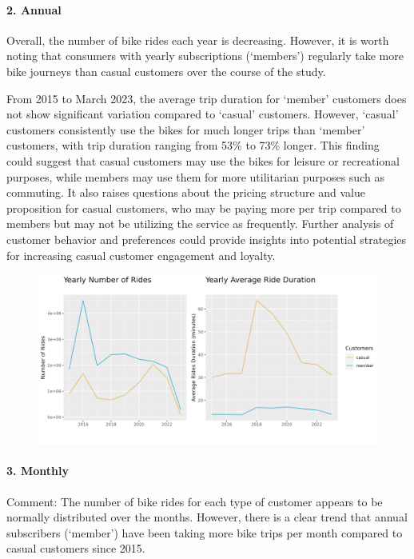 \documentclass[
]{article}
\begin{document}
\hypertarget{annual}{%
\paragraph{2. Annual}\label{annual}}

Overall, the number of bike rides each year is decreasing. However, it
is worth noting that consumers with yearly subscriptions (`members')
regularly take more bike journeys than casual customers over the course
of the study.

From 2015 to March 2023, the average trip duration for `member'
customers does not show significant variation compared to `casual'
customers. However, `casual' customers consistently use the bikes for
much longer trips than `member' customers, with trip duration ranging
from 53\% to 73\% longer. This finding could suggest that casual
customers may use the bikes for leisure or recreational purposes, while
members may use them for more utilitarian purposes such as commuting. It
also raises questions about the pricing structure and value proposition
for casual customers, who may be paying more per trip compared to
members but may not be utilizing the service as frequently. Further
analysis of customer behavior and preferences could provide insights
into potential strategies for increasing casual customer engagement and
loyalty.

\begin{figure}
\includegraphics[width=1\linewidth]{outputs/img/line_plots__average_number_of_rides_and_duration_per_customer_by_year} \end{figure}

\hypertarget{monthly}{%
\paragraph{3. Monthly}\label{monthly}}

Comment: The number of bike rides for each type of customer appears to
be normally distributed over the months. However, there is a clear trend
that annual subscribers (`member') have been taking more bike trips per
month compared to casual customers since 2015.
\end{document}
